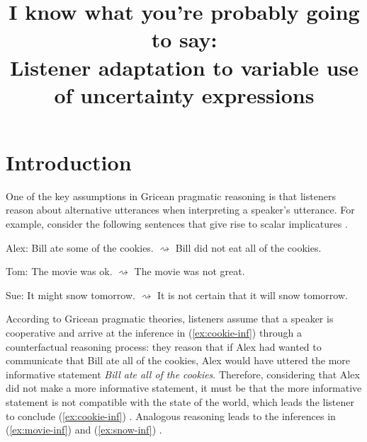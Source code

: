 \documentclass[lucida,biblatex]{sp} %
\title{I know what you're probably going to say: \\ Listener adaptation to variable use of uncertainty expressions}
\author{%
  \spauthor{Sebastian Schuster and Judith Degen\\ \today}
}
\begin{document}

\maketitle





\section{Introduction}


One of the key assumptions in Gricean pragmatic reasoning \citep{Grice1975} is that listeners reason about alternative utterances when interpreting a speaker's utterance. For example, consider the following sentences that give rise to scalar implicatures \citep{Horn1984}.

\begin{exe}
  \ex 
  \begin{xlist}
    \ex Alex: Bill ate some of the cookies.
    \ex \label{ex:cookie-inf} $\rightsquigarrow$ Bill did not eat all of the cookies.
  \end{xlist}
  \ex 
  \begin{xlist} 
    \ex Tom: The movie was ok.
    \ex \label{ex:movie-inf} $\rightsquigarrow$  The movie was not great.
  \end{xlist}
  \ex 
  \begin{xlist} 
    \ex Sue: It might snow tomorrow.
    \ex \label{ex:snow-inf} $\rightsquigarrow$  It is not certain that it will snow tomorrow.
  \end{xlist}
\end{exe}
According to Gricean pragmatic theories, listeners assume that a speaker is cooperative and arrive at the inference in (\ref{ex:cookie-inf}) through a counterfactual reasoning process: they reason that if Alex had wanted to communicate that Bill ate all of the cookies, Alex would have uttered the more informative statement \textit{Bill ate all of the cookies}. Therefore, considering that Alex did not make a more informative statement, it must be that the more informative statement is not compatible with the state of the world, which leads the listener to conclude (\ref{ex:cookie-inf}) . Analogous reasoning leads to the inferences in (\ref{ex:movie-inf})  and (\ref{ex:snow-inf}) .
\end{document}
